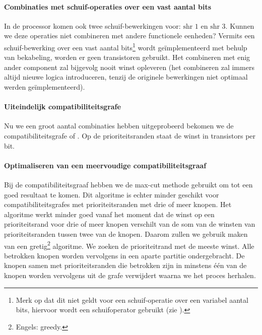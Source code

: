 \paragraph{Combinaties met schuif-operaties over een vast aantal bits}In de processor komen ook twee schuif-bewerkingen voor: $\mbox{shr 1}$ en $\mbox{shr 3}$. Kunnen we deze operaties niet combineren met andere functionele eenheden? Vermits een schuif-bewerking over een vast aantal bits\footnote{Merk op dat dit niet geldt voor een schuif-operatie over een variabel aantal bits, hiervoor wordt een schuifoperator gebruikt (zie ).} wordt ge\"implementeerd met behulp van bekabeling, worden er geen transistoren gebruikt. Het combineren met enig ander component zal bijgevolg nooit winst opleveren (het combineren zal immers altijd nieuwe logica introduceren, tenzij de originele bewerkingen niet optimaal werden ge\"implementeerd).
\paragraph{Uiteindelijk compatibiliteitsgrafe} Nu we een groot aantal combinaties hebben uitgeprobeerd bekomen we de compatibiliteitsgrafe of . Op de prioriteitsranden staat de winst in transistors per bit.
\paragraph{Optimaliseren van een meervoudige compatibiliteitsgraaf}
Bij de compatibiliteitsgraaf hebben we de max-cut methode gebruikt om tot een goed resultaat te komen. Dit algoritme is echter minder geschikt voor compatibiliteitsgrafes met prioriteitsranden met drie of meer knopen. Het algoritme werkt minder goed vanaf het moment dat de winst op een prioriteitsrand voor drie of meer knopen verschilt van de som van de winsten van prioriteitsranden tussen twee van de knopen. Daarom zullen we gebruik maken van een gretig\footnote{Engels: greedy.} algoritme. We zoeken de prioriteitrand met de meeste winst. Alle betrokken knopen worden vervolgens in een aparte partitie ondergebracht. De knopen samen met prioriteitsranden die betrokken zijn in minstens \'e\'en van de knopen worden vervolgens uit de grafe verwijdert waarna we het proces herhalen.

